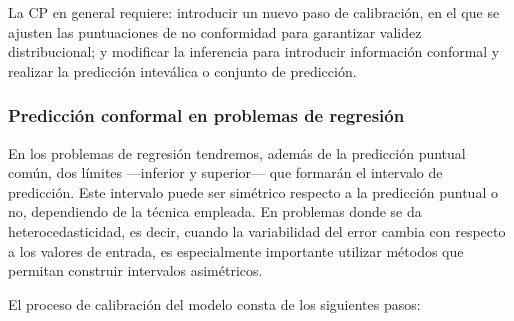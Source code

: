 La CP en general requiere: introducir un nuevo paso de calibración, en el que se ajusten
las puntuaciones de no conformidad para garantizar validez distribucional; 
y modificar la inferencia para introducir información conformal y realizar la predicción inteválica o conjunto
de predicción.


\subsubsection{Predicción conformal en problemas de regresión}

En los problemas de regresión tendremos, además de la predicción puntual común, dos límites ---inferior y 
superior--- que formarán el intervalo de predicción. 
Este intervalo puede ser simétrico respecto a la predicción puntual o no, dependiendo de la técnica empleada.
En problemas donde se da heterocedasticidad, es decir, cuando la variabilidad del error cambia con respecto a 
los valores de entrada, es especialmente importante utilizar métodos que permitan construir intervalos 
asimétricos.


El proceso de calibración del modelo consta de los siguientes pasos:

